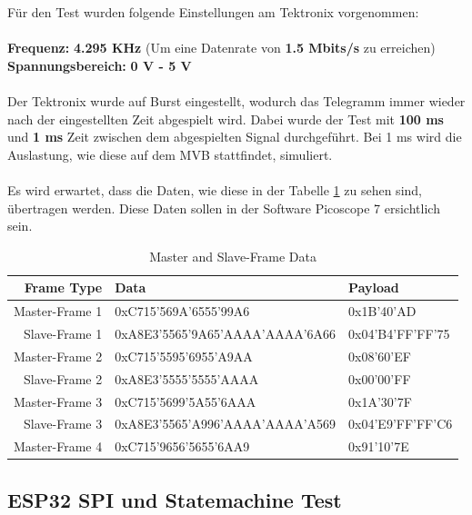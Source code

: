 Für den Test wurden folgende Einstellungen am Tektronix vorgenommen:\\
\\
\textbf{Frequenz:}\hspace{1.87cm} \textbf{4.295 KHz} (Um eine Datenrate von \textbf{1.5 Mbits/s} zu erreichen)\\
\textbf{Spannungsbereich:}\hspace{0.25cm} \textbf{0 V - 5 V}\\
\\
Der Tektronix wurde auf Burst eingestellt, wodurch das Telegramm immer wieder nach der eingestellten Zeit abgespielt wird.
Dabei wurde der Test mit \textbf{100 ms} und \textbf{1 ms} Zeit zwischen dem abgespielten Signal durchgeführt. Bei 1 ms wird die Auslastung, wie diese auf dem MVB stattfindet,
simuliert.\\
\\
Es wird erwartet, dass die Daten, wie diese in der Tabelle \ref{tab:frame_data} zu sehen sind, übertragen werden. Diese Daten sollen in der Software Picoscope 7 ersichtlich sein.

\begin{table}[h!]
    \centering
    \begin{tabular}{r||l||l}
        \toprule
        \textbf{Frame Type} & \textbf{Data}  & \textbf{Payload} \\ 
        \midrule
        Master-Frame 1 & 0xC715’569A’6555’99A6 & 0x1B'40'AD \\
        Slave-Frame 1  & 0xA8E3’5565’9A65’AAAA’AAAA’6A66 & 0x04'B4'FF'FF'75 \\
        \midrule
        Master-Frame 2 & 0xC715’5595’6955’A9AA & 0x08'60'EF \\
        Slave-Frame 2  & 0xA8E3’5555’5555’AAAA & 0x00'00'FF\\
        \midrule
        Master-Frame 3 & 0xC715’5699’5A55’6AAA & 0x1A'30'7F \\
        Slave-Frame 3  & 0xA8E3’5565’A996’AAAA’AAAA’A569 & 0x04'E9'FF'FF'C6 \\
        \midrule
        Master-Frame 4 & 0xC715’9656’5655’6AA9 & 0x91'10'7E\\
        \bottomrule
    \end{tabular}
    \caption{Master and Slave-Frame Data}
    \label{tab:frame_data}
\end{table}




\subsection{ESP32 SPI und Statemachine Test}
\label{sub:ESPSPIundFSMTest}

